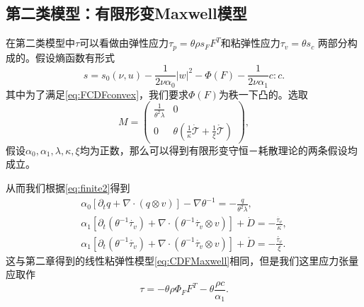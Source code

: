 \subsection{第二类模型：有限形变Maxwell模型}
在第二类模型中$\tau$可以看做由弹性应力$\tau_p = \theta \rho s_F F^T$和粘弹性应力$\tau_v=\theta s_c$
两部分构成的。假设熵函数有形式
\begin{equation*}
 	s = s_0(\nu,u) - \frac{1}{2 \nu \alpha_0} |w|^2 - \Phi (F)  - \frac{1}{2\nu \alpha_1}c:c .
\end{equation*}
其中为了满足\eqref{eq:FCDFconvex}，我们要求$\Phi(F)$为秩一下凸的。选取
\begin{equation*}
	M = \left( \begin{array}{ccc} 
			\frac{1}{\theta^2 \lambda} & 0 \\
			0 &  \theta(\frac{1}{\kappa} \dot{\mathcal{T}} + \frac{1}{\xi} \mathring{\mathcal{T}})
		\end{array} \right),
\end{equation*}
假设$\alpha_0,\alpha_1,\lambda,\kappa,\xi$均为正数，那么可以得到有限形变守恒－耗散理论的两条假设均成立。

从而我们根据\eqref{eq:finite2}得到
	\begin{subequations}
		\begin{align*}
			\alpha_0 [\partial_t q +  \nabla \cdot (q \otimes v)] - \nabla \theta^{-1} = -\frac{q}{\theta^2 \lambda}, \\
			\alpha_1[\partial_t (\theta^{-1} \dot{\tau_v}) + \nabla \cdot (\theta^{-1} \dot{\tau_v} \otimes v)] + \dot{D} = -\frac{\dot{\tau_v}}{\kappa}, \\
			\alpha_1[\partial_t (\theta^{-1} \mathring{\tau_v}) + \nabla \cdot (\theta^{-1} \mathring{\tau_v} \otimes v)] + \mathring{D} = -\frac{\mathring{\tau_v}}{\xi}. 
		\end{align*}
	\end{subequations}
这与第二章得到的线性粘弹性模型\eqref{eq:CDFMaxwell}相同，但是我们这里应力张量应取作
\begin{equation*}
	\tau = -\theta \rho \Phi_F F^T - \theta \frac{\rho c}{\alpha_1}.
\end{equation*}


